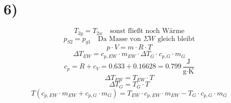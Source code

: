 \section*{6)}
\begin{equation*}
    T_{2g} = T_{2w} \quad \text{sonst fließt noch Wärme}
\end{equation*}
\begin{equation*}
    p_{S2} = p_{g1} \quad \text{Da Masse von } \Sigma W \text{ gleich bleibt}
\end{equation*}
\begin{equation*}
    p \cdot V = m \cdot R \cdot T
\end{equation*}
\begin{equation*}
    \Delta T_{EW} = c_{p,EW} \cdot m_{EW} \cdot \Delta T_G \cdot c_{p,G} \cdot m_G
\end{equation*}
\begin{equation*}
    c_p = R + c_V = 0.633 + 0.16628 = 0.799 \, \frac{\text{J}}{\text{g} \cdot \text{K}}
\end{equation*}
\begin{equation*}
    \Delta T_{EW} = T_{EW} \cdot T
\end{equation*}
\begin{equation*}
    \Delta T_G = T_G \cdot T
\end{equation*}
\begin{equation*}
    T \left( c_{p,EW} \cdot m_{EW} + c_{p,G} \cdot m_G \right) = T_{EW} \cdot c_{p,EW} \cdot m_{EW} - T_G \cdot c_{p,G} \cdot m_G
\end{equation*}
